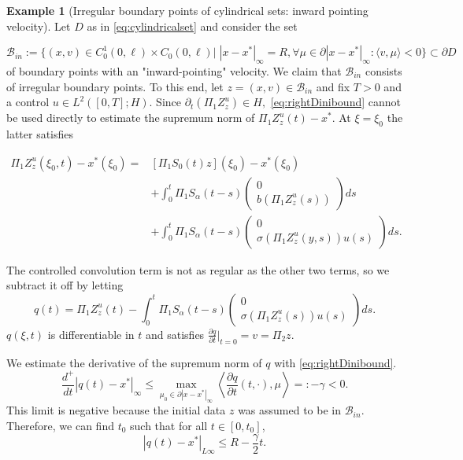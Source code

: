 \documentclass[10pt, reqno]{amsart}
\theoremstyle{definition}
\newtheorem{example}{Example}
\numberwithin{lem}{section}
\numberwithin{cor}{section}
\numberwithin{prop}{section}
\numberwithin{thm}{section}
\numberwithin{dfn}{section}
\begin{document}
\begin{example}[Irregular boundary points of cylindrical sets: inward pointing velocity]\label{ex:irregularPointscylinders}
     Let $D$ as in \eqref{eq:cylindricalset} and consider the set

$$\mathcal{B}_{in}:=\bigg\{(x,v)\in C^1_0(0,\ell)\times C_0(0,\ell)\bigg| \;|x-x^*|_{\infty}=R, \forall\mu\in\partial|x-x^*|_{\infty}:\langle v, \mu\rangle< 0\bigg\}\subset \partial D $$
of boundary points with an "inward-pointing" velocity. We claim that $\mathcal{B}_{in}$ consists of irregular boundary points. To this end,  let $z=(x,v)\in\mathcal{B}_{in}$ and fix $T>0$ and a control $u\in L^2([0, T];H).$ Since $\partial_t( \Pi_1Z^u_z)\in H,$  \eqref{eq:rightDinibound} cannot be used directly to estimate the supremum norm of $\Pi_1Z^u_z(t)-x^*.$ At $\xi=\xi_0$ the latter satisfies

\begin{align*}
    \Pi_1 Z^u_z(\xi_0,t) - x^*(\xi_0) = &[\Pi_1 S_0(t)z](\xi_0) -x^*(\xi_0) \nonumber\\
    &+\int_0^t \Pi_1 S_\alpha(t-s) \begin{pmatrix} 0 \\  b(\Pi_1 Z^u_z(s)) \end{pmatrix}ds\nonumber\\
    &+\int_0^t \Pi_1 S_\alpha(t-s) \begin{pmatrix} 0 \\ \sigma(\Pi_1 Z^u_z(y,s))u(s)\end{pmatrix}ds.
\end{align*}

The controlled convolution term is not as regular as the other two terms, so we subtract it off by letting
\begin{equation*}
    q(t) = \Pi_1 Z^u_z(t) - \int_0^t \Pi_1 S_\alpha(t-s)\begin{pmatrix} 0 \\\sigma(\Pi_1 Z^u_z(s)) u(s) \end{pmatrix}ds.
\end{equation*}
$q(\xi,t)$ is differentiable in $t$ and satisfies
$\frac{\partial q}{\partial t} \Big|_{t=0} = v = \Pi_2 z$. 

We estimate the derivative of the supremum norm of $q$ with \eqref{eq:rightDinibound}.
\begin{equation*}
    \frac{d^+}{dt}|q(t) - x^*|_\infty \leq \max_{\mu_0 \in \partial |x-x^*|_\infty}\left< \frac{\partial q}{\partial t}(t,\cdot),\mu\right>=:-\gamma<0. 
\end{equation*}
This limit is negative because the initial data $z$ was assumed to be in $\mathcal{B}_{in}$. Therefore, we can find $t_0$ such that for all $t \in [0,t_0]$,
$$|q(t) - x^*|_{L\infty} \leq R-\frac{\gamma}{2} t.$$




\end{example}
\end{document}
